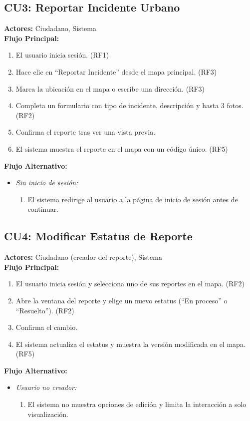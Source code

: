 \subsection*{CU3: Reportar Incidente Urbano}
\textbf{Actores:} Ciudadano, Sistema\\
\textbf{Flujo Principal:}
\begin{enumerate}
    \item El usuario inicia sesión. (RF1)
    \item Hace clic en ``Reportar Incidente'' desde el mapa principal. (RF3)
    \item Marca la ubicación en el mapa o escribe una dirección. (RF3)
    \item Completa un formulario con tipo de incidente, descripción y hasta 3 fotos. (RF2)
    \item Confirma el reporte tras ver una vista previa.
    \item El sistema muestra el reporte en el mapa con un código único. (RF5)
\end{enumerate}
\textbf{Flujo Alternativo:}
\begin{itemize}
    \item \textit{Sin inicio de sesión:}
    \begin{enumerate}
        \item El sistema redirige al usuario a la página de inicio de sesión antes de continuar.
    \end{enumerate}
\end{itemize}

\subsection*{CU4: Modificar Estatus de Reporte}
\textbf{Actores:} Ciudadano (creador del reporte), Sistema\\
\textbf{Flujo Principal:}
\begin{enumerate}
    \item El usuario inicia sesión y selecciona uno de sus reportes en el mapa. (RF2)
    \item Abre la ventana del reporte y elige un nuevo estatus (``En proceso'' o ``Resuelto''). (RF2)
    \item Confirma el cambio.
    \item El sistema actualiza el estatus y muestra la versión modificada en el mapa. (RF5)
\end{enumerate}
\textbf{Flujo Alternativo:}
\begin{itemize}
    \item \textit{Usuario no creador:}
    \begin{enumerate}
        \item El sistema no muestra opciones de edición y limita la interacción a solo visualización.
    \end{enumerate}
\end{itemize}

